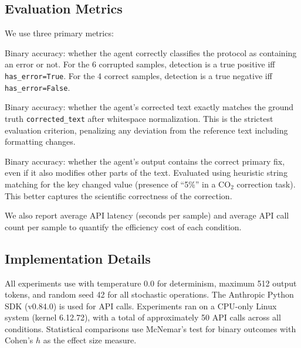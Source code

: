 \subsection{Evaluation Metrics}
\label{sec:method:eval}

We use three primary metrics:

Binary accuracy: whether the agent correctly classifies the protocol as containing an error or not.
For the 6 corrupted samples, detection is a true positive iff \texttt{has\_error=True}.
For the 4 correct samples, detection is a true negative iff \texttt{has\_error=False}.

Binary accuracy: whether the agent's corrected text exactly matches the ground truth \texttt{corrected\_text} after whitespace normalization.
This is the strictest evaluation criterion, penalizing any deviation from the reference text including formatting changes.

Binary accuracy: whether the agent's output contains the correct primary fix, even if it also modifies other parts of the text.
Evaluated using heuristic string matching for the key changed value (\eg presence of ``5\%'' in a CO$_2$ correction task).
This better captures the scientific correctness of the correction.

We also report average API latency (seconds per sample) and average API call count per sample to quantify the efficiency cost of each condition.

\subsection{Implementation Details}
\label{sec:method:impl}

All experiments use \claude with temperature 0.0 for determinism, maximum 512 output tokens, and random seed 42 for all stochastic operations.
The Anthropic Python SDK (v0.84.0) is used for API calls.
Experiments ran on a CPU-only Linux system (kernel 6.12.72), with a total of approximately 50 API calls across all conditions.
Statistical comparisons use McNemar's test for binary outcomes with Cohen's $h$ as the effect size measure.

